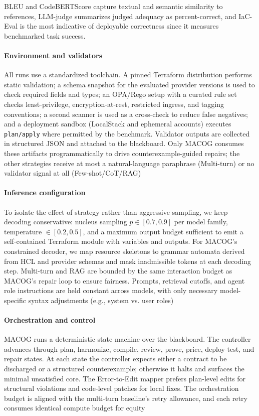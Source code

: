 \documentclass[acmsmall,screen,review,anonymous]{acmart}
\begin{document}
BLEU and CodeBERTScore capture textual and semantic similarity to references, LLM-judge summarizes judged adequacy as percent-correct, and IaC-Eval is the most indicative of deployable correctness since it measures benchmarked task success.


\paragraph{Environment and validators}
All runs use a standardized toolchain. A pinned Terraform distribution performs static validation; a schema snapshot for the evaluated provider versions is used to check required fields and types; an OPA/Rego setup with a curated rule set checks least-privilege, encryption-at-rest, restricted ingress, and tagging conventions; a second scanner is used as a cross-check to reduce false negatives; and a deployment sandbox (LocalStack and ephemeral accounts) executes \texttt{plan/apply} where permitted by the benchmark. Validator outputs are collected in structured JSON and attached to the blackboard. Only MACOG consumes these artifacts programmatically to drive counterexample-guided repairs; the other strategies receive at most a natural-language paraphrase (Multi-turn) or no validator signal at all (Few-shot/CoT/RAG)

\paragraph{Inference configuration}
To isolate the effect of strategy rather than aggressive sampling, we keep decoding conservative: nucleus sampling $p \in [0.7,0.9]$ per model family, temperature $\in [0.2,0.5]$, and a maximum output budget sufficient to emit a self-contained Terraform module with variables and outputs. For MACOG’s constrained decoder, we map resource skeletons to grammar automata derived from HCL and provider schemas and mask inadmissible tokens at each decoding step. Multi-turn and RAG are bounded by the same interaction budget as MACOG’s repair loop to ensure fairness. Prompts, retrieval cutoffs, and agent role instructions are held constant across models, with only necessary model-specific syntax adjustments (e.g., system vs. user roles)

\paragraph{Orchestration and control}
MACOG runs a deterministic state machine over the blackboard. The controller advances through plan, harmonize, compile, review, prove, price, deploy-test, and repair states. At each state the controller expects either a contract to be discharged or a structured counterexample; otherwise it halts and surfaces the minimal unsatisfied core. The Error-to-Edit mapper prefers plan-level edits for structural violations and code-level patches for local fixes. The orchestration budget is aligned with the multi-turn baseline’s retry allowance, and each retry consumes identical compute budget for equity
\end{document}
